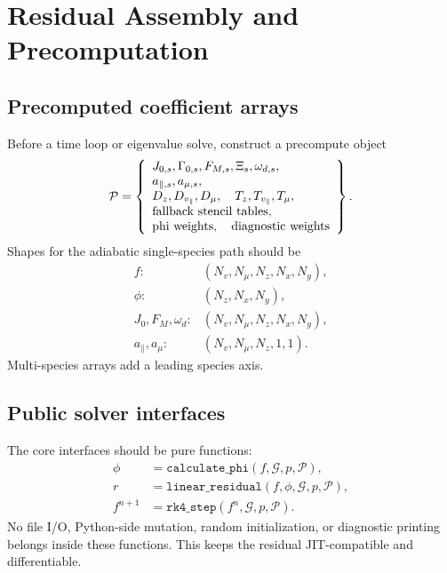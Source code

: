 \documentclass[11pt,a4paper]{article}
\newcommand{\Jzero}{J_0}
\begin{document}
\section{Residual Assembly and Precomputation}

\subsection{Precomputed coefficient arrays}

Before a time loop or eigenvalue solve, construct a precompute object
\begin{equation}
  \mathcal{P} =
  \left\{
  \begin{array}{l}
  J_{0,s},\Gamma_{0,s},F_{M,s},\Xi_s,\omega_{d,s},\\
  a_{\parallel,s},a_{\mu,s},\\
  D_z,D_{v_\parallel},D_\mu,\quad
  T_z,T_{v_\parallel},T_\mu,\\
  \hbox{fallback stencil tables},\\
  \hbox{phi weights},\quad
  \hbox{diagnostic weights}
  \end{array}
  \right\}.
  \label{eq:precompute}
\end{equation}
Shapes for the adiabatic single-species path should be
\begin{equation}
\begin{array}{ll}
f: & (N_v,N_\mu,N_z,N_x,N_y),\\
\phi: & (N_z,N_x,N_y),\\
\Jzero,F_M,\omega_d: & (N_v,N_\mu,N_z,N_x,N_y),\\
a_\parallel,a_\mu: & (N_v,N_\mu,N_z,1,1).
\end{array}
\end{equation}
Multi-species arrays add a leading species axis.

\subsection{Public solver interfaces}

The core interfaces should be pure functions:
\begin{align}
  \phi &= \texttt{calculate\_phi}(f,\mathcal{G},p,\mathcal{P}),
  \label{eq:api-phi}
  \\
  r &= \texttt{linear\_residual}(f,\phi,\mathcal{G},p,\mathcal{P}),
  \label{eq:api-residual}
  \\
  f^{n+1} &= \texttt{rk4\_step}(f^n,\mathcal{G},p,\mathcal{P}).
  \label{eq:api-rk4}
\end{align}
No file I/O, Python-side mutation, random initialization, or diagnostic printing belongs inside these functions.  This keeps the residual JIT-compatible and differentiable.
\end{document}
